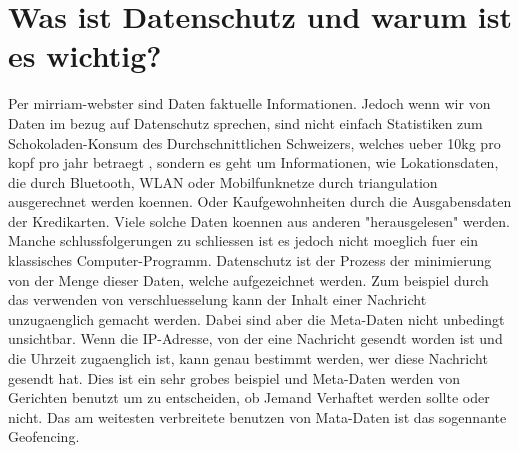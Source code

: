 \documentclass{report}
\begin{document}
\section{Was ist Datenschutz und warum ist es wichtig?}
Per mirriam-webster \citep{data-def} sind Daten faktuelle Informationen.
Jedoch wenn wir von Daten im bezug auf Datenschutz sprechen, sind nicht einfach Statistiken zum Schokoladen-Konsum des Durchschnittlichen Schweizers, welches ueber 10kg pro kopf pro jahr betraegt \citep{schokoladenkonsum-pro-kops-schweiz},
sondern es geht um Informationen, wie Lokationsdaten, die durch Bluetooth, WLAN oder Mobilfunknetze durch triangulation ausgerechnet werden koennen. Oder Kaufgewohnheiten durch die Ausgabensdaten der Kredikarten.
Viele solche Daten koennen aus anderen "herausgelesen" werden. Manche schlussfolgerungen zu schliessen ist es jedoch nicht moeglich fuer ein klassisches Computer-Programm.
\newline
\newline
Datenschutz ist der Prozess der minimierung von der Menge dieser Daten, welche aufgezeichnet werden. Zum beispiel durch das verwenden von verschluesselung kann der Inhalt einer Nachricht unzugaenglich gemacht werden. Dabei sind aber die Meta-Daten \citep{metadata} nicht unbedingt unsichtbar. Wenn die IP-Adresse, von der eine Nachricht gesendt worden ist und die Uhrzeit zugaenglich ist, kann genau bestimmt werden, wer diese Nachricht gesendt hat. Dies ist ein sehr grobes beispiel und Meta-Daten werden von Gerichten benutzt um zu entscheiden, ob Jemand Verhaftet werden sollte oder nicht. 
\newline
\newline
Das am weitesten verbreitete benutzen von Mata-Daten ist das sogennante Geofencing.\citep{geofencing}
\end{document}
